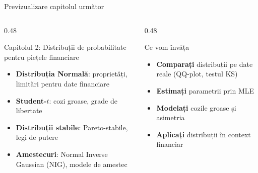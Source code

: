 \documentclass[9pt, aspectratio=169, t]{beamer}
\theoremstyle{definition}
\begin{document}
\begin{frame}{Previzualizare capitolul următor}
    \begin{columns}[T]
        \begin{column}{0.48\textwidth}
        \begin{block}{Capitolul 2: Distribuții de probabilitate pentru piețele financiare}
            \begin{itemize}
                \item \textbf{Distribuția Normală}: proprietăți, limitări pentru date financiare
                \item \textbf{Student-$t$}: cozi groase, grade de libertate
                \item \textbf{Distribuții stabile}: Pareto-stabile, legi de putere
                \item \textbf{Amestecuri}: Normal Inverse Gaussian (NIG), modele de amestec
            \end{itemize}
        \end{block}
        \end{column}
        \begin{column}{0.48\textwidth}
        \begin{exampleblock}{Ce vom învăța}
            \begin{itemize}
                \item \textbf{Comparați} distribuții pe date reale (QQ-plot, testul KS)
                \item \textbf{Estimați} parametrii prin MLE
                \item \textbf{Modelați} cozile groase și asimetria
                \item \textbf{Aplicați} distribuții în context financiar
            \end{itemize}
        \end{exampleblock}
        \end{column}
    \end{columns}
\end{frame}

\end{document}
